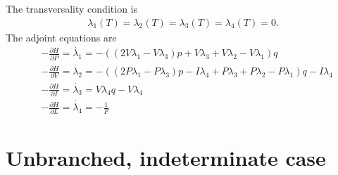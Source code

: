 \documentclass[12pt, oneside]{article}   	%
\begin{document}
%
The transversality condition is
%
\begin{align}
\lambda_1(T) = \lambda_2(T) = \lambda_3(T) = \lambda_4(T) = 0.
\end{align}
%
The adjoint equations are
%
\begin{align}
&-\frac{\partial H}{\partial P} = \dot{\lambda_1}  = -((2 V \lambda_1-V \lambda_3)p+V \lambda_3+V \lambda_2-V \lambda_1)q \nonumber \\
&-\frac{\partial H}{\partial V} = \dot{\lambda_2}  = -((2 P \lambda_1-P \lambda_3)p-I \lambda_4+P \lambda_3+P \lambda_2-P \lambda_1)q-I \lambda_4  \nonumber\\
&-\frac{\partial H}{\partial I} = \dot{\lambda_3}  = V \lambda_4q-V \lambda_4 \nonumber \\
&-\frac{\partial H}{\partial L} = \dot{\lambda_4}  = -\frac{1}{F}  
\end{align}

\clearpage
\newpage


\section*{Unbranched, indeterminate case}
\end{document}
